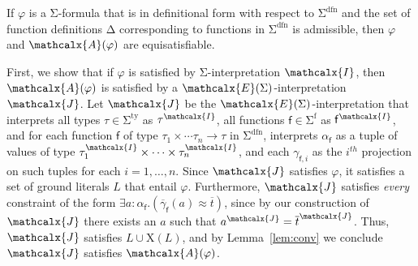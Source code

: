 \documentclass[runningheads,a4paper]{llncs}
\newcommand\DDD{\Delta}
\newcommand{\con}[1]{\mathsf{#1}}
\renewcommand\vec[1]{\overline{#1}}
\let\oldcup=\cup
\def\cup{\mathrel{\oldcup}}
\let\oldchi=\chi
\def\chi{{\vthinspace\oldchi}}
\let\oldSigma=\Sigma
\def\Sigma{\mathrm{\oldSigma}}
\let\oldDelta=\Delta
\def\Delta{\mathrm{\oldDelta}}
\newcommand{\teq}{\approx}
\newcommand{\I}{\mathcalx{I}}
\newcommand{\J}{\mathcalx{J}}
\newcommand{\conv}{\mathcalx{A}}
\newcommand{\stypes}[1]{#1^\mathrm{ty}}
\newcommand{\sfuns}[1]{#1^\mathrm{f}}
\newcommand{\sfundefs}[1]{#1^\mathrm{dfn}}
\newcommand{\ppos}{{+}}
\newcommand\ty[1]{\con{#1}}
\newcommand{\Bool}{\ty{Bool}}
\newcommand\concret{\gamma} %
\newcommand{\vecfarg}[1]{\vec{\concret}_{#1}}
\newcommand{\fargx}[2]{\concret_{#1,#2}}
\newcommand{\fargtype}[1]{\alpha_{#1}}
\newcommand{\extendsig}[1]{\mathcalx{E}( #1 )}
\newcommand{\vthinspace}{\kern+0.083333em}
\newcommand{\typ}[1]{^{\vthinspace #1}}
\newcommand{\absconstraints}{\mathrm{X}}
\begin{document}
\begin{theorem}\label{thm:equi}
If $\varphi$ is a\/ $\Sigma$-formula that is in definitional form with respect to\/
$\sfundefs{\Sigma}$
and the set of function definitions\/ $\DDD$ corresponding to functions in\/
$\sfundefs{\Sigma}$ is admissible, then\/ $\varphi$ and\/ $\conv( \varphi )$ are
equisatisfiable.
\end{theorem}
\begin{proofsketch}
First, we show that if $\varphi$ is satisfied by $\Sigma$-interpretation $\I$, then $\conv( \varphi )$ is satisfied by a $\extendsig{\Sigma}$-interpretation $\J$.
Let $\J$ be the $\extendsig{\Sigma}$-interpretation that interprets all types $\tau \in \stypes{\Sigma}$ as $\tau^\I$,
all functions $\con{f} \in \sfuns{\Sigma}$ as $\con{f}^\I$,
and for each function $\con{f}$ of type $\tau_1 \times \cdots \tau_n \rightarrow \tau$ in $\sfundefs{\Sigma}$,
interprets $\fargtype{\con{f}}$ as a tuple of values of type $\tau_1^\I \times \cdots \times \tau_n^\I$,
and each $\fargx{\con{f}}{i}$ as the $i^{th}$ projection on such tuples for each $i = 1, \ldots, n$.
Since $\J$ satisfies $\varphi$, it satisfies a set of ground literals $L$ that entail $\varphi$.
Furthermore, $\J$ satisfies \emph{every} constraint of the form $\exists a : {\fargtype{\con{f}}}. ( \vecfarg{\con{f}}( a ) \teq \vec t )$,
since by our construction of $\J$ there exists an $a$ such that $a^\J = \vec t^\J$.
Thus, $\J$ satisfies $L \cup \absconstraints( L )$, and by Lemma~\ref{lem:conv} we conclude $\J$ satisfies $\conv( \varphi )$.


\end{proofsketch}
\end{document}
